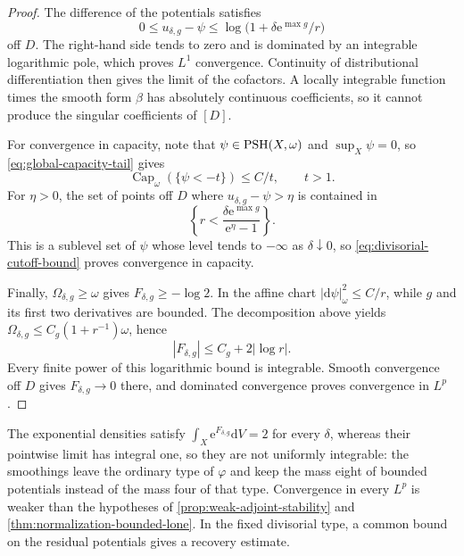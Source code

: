 \begin{proof}
The difference of the potentials satisfies
\[
 0\leq u_{\delta,g}-\psi
 \leq\log\bigl(1+\delta\mathrm e^{\max g}/r\bigr)
\]
off $D$. The right-hand side tends to zero and is dominated by an integrable logarithmic pole, which proves $L^1$ convergence. Continuity of distributional differentiation then gives the limit of the cofactors. A locally integrable function times the smooth form $\beta$ has absolutely continuous coefficients, so it cannot produce the singular coefficients of $[D]$.

For convergence in capacity, note that $\psi\in\mathrm{PSH}(X,\omega)$ and $\sup_X\psi=0$, so \eqref{eq:global-capacity-tail} gives
\begin{equation}\label{eq:divisorial-cutoff-bound}
 \operatorname{Cap}_\omega(\{\psi<-t\})\leq C/t,\qquad t>1.
\end{equation}
For $\eta>0$, the set of points off $D$ where $u_{\delta,g}-\psi>\eta$ is contained in
\[
 \left\{r<\frac{\delta\mathrm e^{\max g}}{\mathrm e^\eta-1}\right\}.
\]
This is a sublevel set of $\psi$ whose level tends to $-\infty$ as $\delta\downarrow0$, so \eqref{eq:divisorial-cutoff-bound} proves convergence in capacity.

Finally, $\Omega_{\delta,g}\geq\omega$ gives $F_{\delta,g}\geq-\log2$. In the affine chart $|\mathrm d\psi|_\omega^2\leq C/r$, while $g$ and its first two derivatives are bounded. The decomposition above yields $\Omega_{\delta,g}\leq C_g(1+r^{-1})\omega$, hence
\[
 |F_{\delta,g}|\leq C_g+2|\log r|.
\]
Every finite power of this logarithmic bound is integrable. Smooth convergence off $D$ gives $F_{\delta,g}\to0$ there, and dominated convergence proves convergence in $L^p$.
\end{proof}

The exponential densities satisfy $\int_X\mathrm e^{F_{\delta,g}}\mathrm dV=2$ for every $\delta$, whereas their pointwise limit has integral one, so they are not uniformly integrable: the smoothings leave the ordinary type of $\varphi$ and keep the mass eight of bounded potentials instead of the mass four of that type. Convergence in every $L^p$ is weaker than the hypotheses of \cref{prop:weak-adjoint-stability} and \cref{thm:normalization-bounded-lone}. In the fixed divisorial type, a common bound on the residual potentials gives a recovery estimate.

